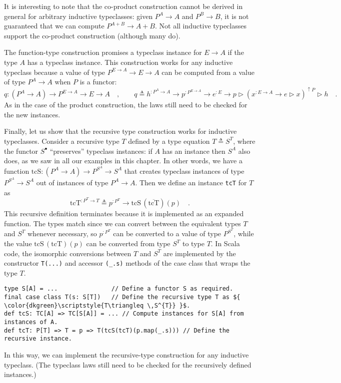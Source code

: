 It is interesting to note that the co-product construction cannot
be derived in general for arbitrary inductive typeclasses: given $P^{A}\rightarrow A$
and $P^{B}\rightarrow B$, it is not guaranteed that we can compute
$P^{A+B}\rightarrow A+B$. Not all inductive typeclasses support the
co-product construction (although many do). 

The function-type construction promises a typeclass instance for $E\rightarrow A$
if the type $A$ has a typeclass instance. This construction works
for any inductive typeclass because a value of type $P^{E\rightarrow A}\rightarrow E\rightarrow A$
can be computed from a value of type $P^{A}\rightarrow A$ when $P$
is a functor:
\[
q:(P^{A}\rightarrow A)\rightarrow P^{E\rightarrow A}\rightarrow E\rightarrow A\quad,\quad\quad q\triangleq h^{:P^{A}\rightarrow A}\rightarrow p^{:P^{E\rightarrow A}}\rightarrow e^{:E}\rightarrow p\triangleright(x^{:E\rightarrow A}\rightarrow e\triangleright x)^{\uparrow P}\triangleright h\quad.
\]
As in the case of the product construction, the laws still need to
be checked for the new instances.

Finally, let us show that the recursive type construction works for
inductive typeclasses. Consider a recursive type $T$ defined by a
type equation $T\triangleq S^{T}$, where the functor $S^{\bullet}$
``preserves'' typeclass instances: if $A$ has an instance then
$S^{A}$ also does, as we saw in all our examples in this chapter.
In other words, we have a function $\text{tcS}:(P^{A}\rightarrow A)\rightarrow P^{S^{A}}\rightarrow S^{A}$
that creates typeclass instances of type $P^{S^{A}}\rightarrow S^{A}$
out of instances of type $P^{A}\rightarrow A$. Then we define an
instance \lstinline!tcT! for $T$ as 
\[
\text{tcT}^{:P^{T}\rightarrow T}\triangleq p^{:P^{T}}\rightarrow\text{tcS}\,(\overline{\text{tcT}})(p)\quad.
\]
This recursive definition terminates because it is implemented as
an expanded function. The types match since we can convert between
the equivalent types $T$ and $S^{T}$ whenever necessary, so $p^{:P^{T}}$
can be converted to a value of type $P^{S^{T}}$, while the value
$\text{tcS}\,(\text{tcT})(p)$ can be converted from type $S^{T}$
to type $T$. In Scala code, the isomorphic conversions between $T$
and $S^{T}$ are implemented by the constructor \lstinline!T(...)!
and accessor \lstinline!(_.s)! methods of the case class that wraps
the type $T$.
\begin{lstlisting}[mathescape=true]
type S[A] = ...               // Define a functor S as required.
final case class T(s: S[T])   // Define the recursive type T as ${ \color{dkgreen}\scriptstyle{T\triangleq \,S^{T}} }$.
def tcS: TC[A] => TC[S[A]] = ... // Compute instances for S[A] from instances of A.
def tcT: P[T] => T = p => T(tcS(tcT)(p.map(_.s))) // Define the recursive instance.
\end{lstlisting}
In this way, we can implement the recursive-type construction for
any inductive typeclass. (The typeclass laws still need to be checked
for the recursively defined instances.)

